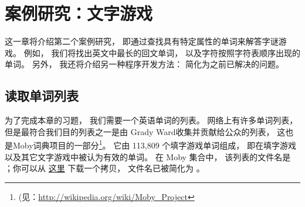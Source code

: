 

\chapter{案例研究：文字游戏}
\label{wordplay}


这一章将介绍第二个案例研究， 即通过查找具有特定属性的单词来解答字谜游戏。
例如， 我们将找出英文中最长的回文单词， 以及字符按照字符表顺序出现的单词。
另外， 我还将介绍另一种程序开发方法： 简化为之前已解决的问题。

\section{读取单词列表}
\label{wordlist}

  

为了完成本章的习题， 我们需要一个英语单词的列表。
网络上有许多单词列表， 但是最符合我们目的列表之一是由 Grady
Ward收集并贡献给公众的列表， 这也是Moby词典项目的一部分\footnote{(见：\url{http://wikipedia.org/wiki/Moby_Project}}。
它由 113,809 个填字游戏单词组成， 即在填字游戏以及其它文字游戏中被认为有效的单词。
在 Moby 集合中， 该列表的文件名是  ；你可以从 \href{http://thinkpython.com/code/words.txt}{这里} 下载一个拷贝， 文件名已被简化为 。

